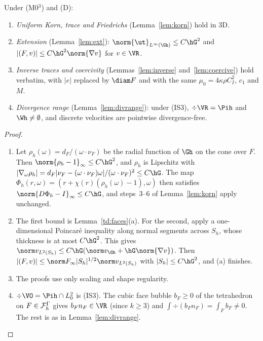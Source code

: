 \begin{lemma}\label{td:tools}
Under (M0$^3$) and (D):
\begin{enumerate}[label=(\alph*)]
\item \emph{Uniform Korn, trace and Friedrichs} (Lemma~\ref{lem:korn}) hold in 3D.
\item \emph{Extension} (Lemma~\ref{lem:ext}): $\norm{\ut}_{L^\infty(\Gh)}\le C\hG^2$ and $|(F,v)|\le C\hG^2\norm{\nabla v}$ for $v\in\VR$.
\item \emph{Inverse traces and coercivity} (Lemmas~\ref{lem:inverse} and~\ref{lem:coercive}) hold verbatim, with $|e|$ replaced by $\diam F$ and with the same $\mu_0=4\kappa\rho C_I^2$, $c_1$ and $M$.
\item \emph{Divergence range} (Lemma~\ref{lem:divrange}): under (IS3), $\div\VR=\Pih$ and $\Wh\ne\emptyset$, and discrete velocities are pointwise divergence-free.
\end{enumerate}
\end{lemma}

\begin{proof}
\begin{enumerate}
\item[(a)] Let $\rho_h(\omega)=d_F/(\omega\cdot\nu_F)$ be the radial function of $\Gh$ on the cone over $F$. Then $\norm{\rho_h-1}_\infty\le C\hG^2$, and $\rho_h$ is Lipschitz with $|\nabla_\omega\rho_h|=d_F|\nu_F-(\omega\cdot\nu_F)\omega|/(\omega\cdot\nu_F)^2\le C\hG$. The map $\Phi_h(r,\omega)=(r+\chi(r)(\rho_h(\omega)-1),\omega)$ then satisfies $\norm{D\Phi_h-I}_\infty\le C\hG$, and steps~3--6 of Lemma~\ref{lem:korn} apply unchanged.
\item[(b)] The first bound is Lemma~\ref{td:faces}(a). For the second, apply a one-dimensional Poincar\'e inequality along normal segments across $S_h$, whose thickness is at most $C\hG^2$. This gives $\norm v_{L^2(S_h)}\le C\hG(\norm v_{\Gh}+\hG\norm{\nabla v})$. Then $|(F,v)|\le\norm F_\infty|S_h|^{1/2}\norm v_{L^2(S_h)}$ with $|S_h|\le C\hG^2$, and (a) finishes.
\item[(c)] The proofs use only scaling and shape regularity.
\item[(d)] $\div\VO=\Pih\cap L^2_0$ is (IS3). The cubic face bubble $b_F\ge0$ of the tetrahedron on $F\in\mathcal F_h^\Gamma$ gives $b_Fn_F\in\VR$ (since $k\ge3$) and $\int\div(b_Fn_F)=\int_Fb_F\ne0$. The rest is as in Lemma~\ref{lem:divrange}.\qedhere
\end{enumerate}
\end{proof}

